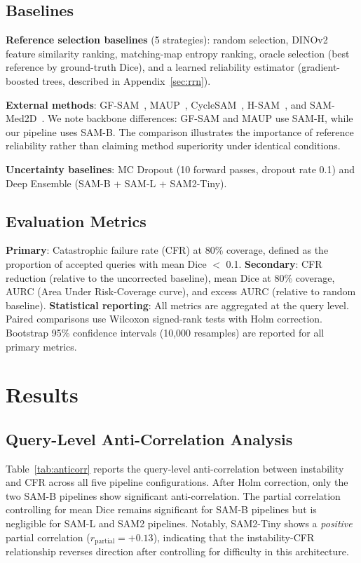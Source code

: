 \documentclass[11pt]{article}
\begin{document}
\subsection{Baselines}

\textbf{Reference selection baselines} (5 strategies): random selection,
DINOv2 feature similarity ranking, matching-map entropy ranking, oracle
selection (best reference by ground-truth Dice), and a learned reliability
estimator (gradient-boosted trees, described in Appendix~\ref{sec:rrn}).

\textbf{External methods}: GF-SAM~\cite{zhang2024gfsam}, MAUP~\cite{zhu2025maup},
CycleSAM~\cite{hou2024cyclesam}, H-SAM~\cite{wu2025hisam}, and
SAM-Med2D~\cite{cheng2023sammed2d}. We note backbone differences:
GF-SAM and MAUP use SAM-H, while our pipeline uses SAM-B. The comparison
illustrates the importance of reference reliability rather than claiming
method superiority under identical conditions.

\textbf{Uncertainty baselines}: MC Dropout (10 forward passes, dropout rate
0.1) and Deep Ensemble (SAM-B + SAM-L + SAM2-Tiny).

\subsection{Evaluation Metrics}

\textbf{Primary}: Catastrophic failure rate (CFR) at 80\% coverage, defined
as the proportion of accepted queries with mean Dice $<$ 0.1. \textbf{Secondary}:
CFR reduction (relative to the uncorrected baseline), mean Dice at 80\%
coverage, AURC (Area Under Risk-Coverage curve), and excess AURC (relative
to random baseline). \textbf{Statistical reporting}: All metrics are
aggregated at the query level. Paired comparisons use Wilcoxon signed-rank
tests with Holm correction. Bootstrap 95\% confidence intervals (10,000
resamples) are reported for all primary metrics.

\section{Results}
\label{sec:results}

\subsection{Query-Level Anti-Correlation Analysis}

Table~\ref{tab:anticorr} reports the query-level anti-correlation between
instability and CFR across all five pipeline configurations. After Holm
correction, only the two SAM-B pipelines show significant anti-correlation.
The partial correlation controlling for mean Dice remains significant for
SAM-B pipelines but is negligible for SAM-L and SAM2 pipelines. Notably,
SAM2-Tiny shows a \emph{positive} partial correlation ($r_{\text{partial}} =
+0.13$), indicating that the instability-CFR relationship reverses direction
after controlling for difficulty in this architecture.
\end{document}
